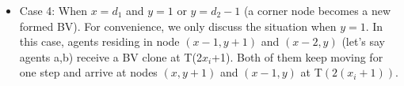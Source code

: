 \begin{itemize}
\item Case 4: When $x=d_1$ and $y=1$ or $y=d_2-1$ (a corner node becomes a new formed BV). For convenience, we only discuss the situation when $y=1$. In this case, agents residing in node $(x-1, y+1)$ and $(x-2, y)$ (let's say agents a,b) receive a BV clone at T(2$x_i$+1). Both of them keep moving for one step and arrive at nodes $(x, y+1)$ and $(x-1, y)$ at T$(2(x_i+1))$.
\begin{figure} [H]
  \centering 
    \hspace{1in} 
\subfigure[$T(2(x_i+2)+1)$]{ 
    \label{fig:subfigmesh4:d} %
}
\end{figure}
\end{itemize}
